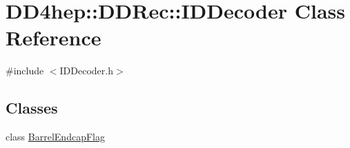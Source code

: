 \hypertarget{class_d_d4hep_1_1_d_d_rec_1_1_i_d_decoder}{}\section{D\+D4hep\+:\+:D\+D\+Rec\+:\+:I\+D\+Decoder Class Reference}
\label{class_d_d4hep_1_1_d_d_rec_1_1_i_d_decoder}


{\ttfamily \#include $<$I\+D\+Decoder.\+h$>$}

\subsection*{Classes}
\begin{DoxyCompactItemize}
\item 
class \hyperlink{class_d_d4hep_1_1_d_d_rec_1_1_i_d_decoder_1_1_barrel_endcap_flag}{Barrel\+Endcap\+Flag}
\end{DoxyCompactItemize}
